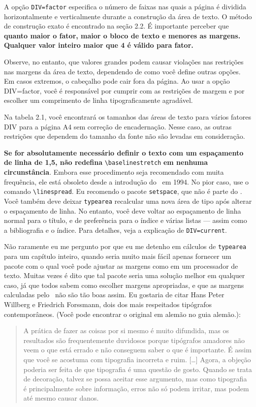 A opção \texttt{DIV=factor} especifica o número de faixas nas quais a página é dividida horizontalmente e verticalmente durante a construção da área de texto. O método de construção exato é encontrado na seção 2.2. É importante perceber que \textbf{quanto maior o fator, maior o bloco de texto e menores as margens. Qualquer valor inteiro maior que 4 é válido para fator.}

Observe, no entanto, que valores grandes podem causar violações nas restrições nas margens da área de texto, dependendo de como você define outras opções. Em casos extremos, o cabeçalho pode cair fora da página. Ao usar a opção DIV=factor, você é responsável por cumprir com as restrições de margem e por escolher um comprimento de linha tipograficamente agradável.

Na tabela 2.1, você encontrará os tamanhos das áreas de texto para vários fatores DIV para a página A4 sem correção de encadernação. Nesse caso, as outras restrições que dependem do tamanho da fonte não são levadas em consideração.

\textbf{Se for absolutamente necessário definir o texto com um espaçamento de linha de 1,5, não redefina} \verb|\baselinestretch| \textbf{em nenhuma circunstância}. Embora esse procedimento seja recomendado com muita frequência, ele está obsoleto desde a introdução do \LaTeXe\ em 1994. No pior caso, use o comando \verb|\linespread|. Eu recomendo o pacote \texttt{setspace}, que não é parte do \KOMAScript. Você também deve deixar \texttt{typearea} recalcular uma nova área de tipo após alterar o espaçamento de linha. No entanto, você deve voltar ao espaçamento de linha normal para o título, e de preferência para o índice e várias listas — assim como a bibliografia e o índice. Para detalhes, veja a explicação de \texttt{DIV=current}.

Não raramente eu me pergunto por que eu me detenho em cálculos de \texttt{typearea} para um capítulo inteiro, quando seria muito mais fácil apenas fornecer um pacote com o qual você pode ajustar as margens como em um processador de texto. Muitas vezes é dito que tal pacote seria uma solução melhor em qualquer caso, já que todos sabem como escolher margens apropriadas, e que as margens calculadas pelo \KOMAScript\ não são tão boas assim. Eu gostaria de citar Hans Peter Willberg e Friedrich Forssmann, dois dos mais respeitados tipógrafos contemporâneos. (Você pode encontrar o original em alemão no guia alemão.):

\begin{quote}
 A prática de fazer as coisas por si mesmo é muito difundida, mas os resultados são frequentemente duvidosos porque tipógrafos amadores não veem o que está errado e não conseguem saber o que é importante. É assim que você se acostuma com tipografia incorreta e ruim. [\ldots] Agora, a objeção poderia ser feita de que tipografia é uma questão de gosto. Quando se trata de decoração, talvez se possa aceitar esse argumento, mas como tipografia é principalmente sobre informação, erros não só podem irritar, mas podem até mesmo causar danos.   
\end{quote}




